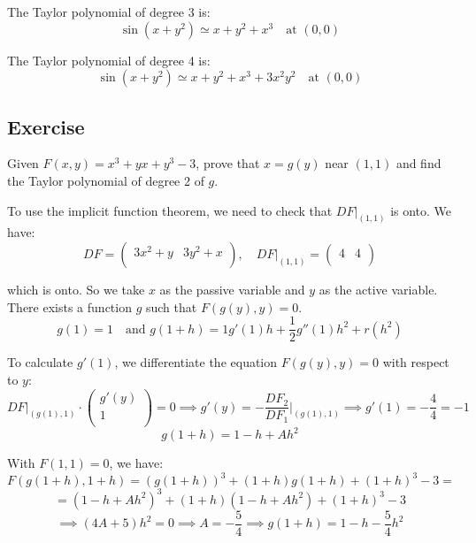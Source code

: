 \documentclass[11pt]{article}
\begin{document}
The Taylor polynomial of degree 3 is:
\[
\sin(x + y^2) \simeq x + y^2 + x^3 \quad \text{at } (0,0)
\]

The Taylor polynomial of degree 4 is:
\[
\sin(x + y^2) \simeq x + y^2 + x^3 + 3x^2y^2 \quad \text{at } (0,0)
\]

\subsection*{Exercise}
Given $F(x,y) = x^3 + yx + y^3 - 3$, prove that $x = g(y)$ near $(1,1)$ and find the Taylor polynomial of degree 2 of $g$.

To use the implicit function theorem, we need to check that $DF\big|_{(1,1)}$ is onto. We have:
\[
DF = \begin{pmatrix}
    3x^2 + y & 3y^2 + x \\
\end{pmatrix}, \quad DF\big|_{(1,1)} = \begin{pmatrix}
    4 & 4 \\
    \end{pmatrix}
\]

which is onto. So we take $x$ as the passive variable and $y$ as the active variable. There exists a function $g$ such that $F(g(y),y) = 0$.
\[
g(1) = 1 \quad \text{and } g(1 + h) = 1 g'(1)h + \frac{1}{2} g''(1)h^2 + r(h^2)
\]

To calculate $g'(1)$, we differentiate the equation $F(g(y),y) = 0$ with respect to $y$:
\[
DF\big|_{(g(1),1)} \cdot \begin{pmatrix}
    g'(y) \\
    1 \\
\end{pmatrix} = 0 \implies g'(y) = -\frac{DF_2}{DF_1} \big|_{(g(1),1)} \implies g'(1) = -\frac{4}{4} = -1
\]
\[
g(1 + h) = 1 - h + Ah^2
\]

With $F(1, 1) = 0$, we have:
\[
F(g(1 + h), 1 + h) = (g(1 + h))^3 + (1 + h)g(1 + h) + (1 + h)^3 - 3 =
\]
\[
= (1 - h + Ah^2)^3 + (1 + h)(1 - h + Ah^2) + (1 + h)^3 - 3
\]
\[
\implies (4A + 5)h^2 = 0 \implies A = -\frac{5}{4} \implies g(1 + h) = 1 - h - \frac{5}{4}h^2
\]
\end{document}
